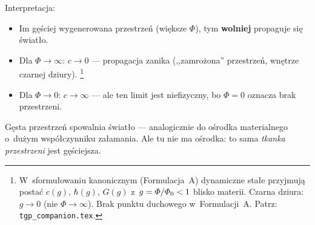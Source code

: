 Interpretacja:
\begin{itemize}[nosep]
  \item Im g\k{e}\'sciej wygenerowana przestrze\'n (wi\k{e}ksze $\Phi$),
        tym \textbf{wolniej} propaguje si\k{e} \'swiat\l{}o.
  \item Dla $\Phi \to \infty$: $c \to 0$ --- propagacja zanika
        (,,zamro\.zona'' przestrze\'n, wn\k{e}trze czarnej dziury).%
        \footnote{W~sformu\l{}owaniu kanonicznym (Formulacja~A) dynamiczne
        sta\l{}e przyjmuj\k{a} posta\'c $c(g)$, $\hbar(g)$, $G(g)$
        z~$g = \varPhi/\varPhi_0 < 1$ blisko materii.
        Czarna dziura: $g \to 0$ (nie $\Phi \to \infty$).
        Brak punktu duchowego w~Formulacji~A.
        Patrz: \texttt{tgp\_companion.tex}.}
  \item Dla $\Phi \to 0$: $c \to \infty$ --- ale ten limit jest
        niefizyczny, bo $\Phi = 0$ oznacza brak przestrzeni.
\end{itemize}

G\k{e}sta przestrze\'n spowalnia \'swiat\l{}o --- analogicznie do
o\'srodka materialnego o~du\.zym wsp\'o\l{}czynniku za\l{}amania.
Ale tu nie ma o\'srodka: to sama \emph{tkanka przestrzeni}
jest g\k{e}\'sciejsza.

